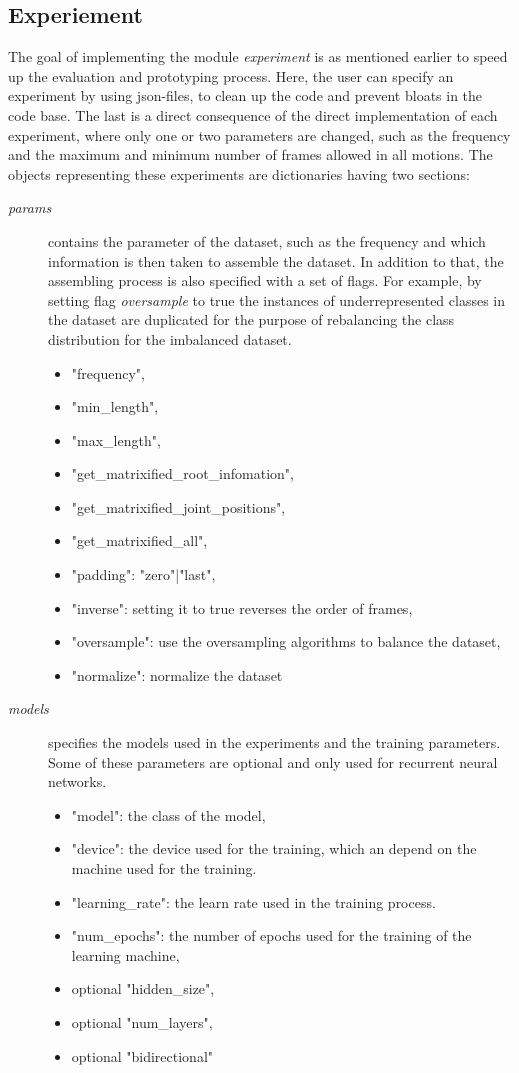 		\subsection{Experiement}
			The goal of implementing the module \textit{experiment} is as mentioned earlier to speed up the evaluation and prototyping process. Here, the user can specify an experiment by using json-files, to clean up the code and prevent bloats in the code base. The last is a direct consequence of the direct implementation of each experiment, where only one or two parameters are changed, such as the frequency and the maximum and minimum number of frames allowed in all motions. The objects representing these experiments are dictionaries having two sections:
			\begin{description}
				\item[\textit{params}] contains the parameter of the dataset, such as the frequency and which information is then taken to assemble the dataset. In addition to that, the assembling process is also specified with a set of flags. For example, by setting flag \textit{oversample} to true the instances of underrepresented classes in the dataset are duplicated for the purpose of rebalancing the class distribution for the imbalanced dataset. 
					\begin{itemize}
						\item "frequency",
						\item "min\_length",
						\item "max\_length",
						\item "get\_matrixified\_root\_infomation",
						\item "get\_matrixified\_joint\_positions",
						\item "get\_matrixified\_all",
						\item "padding": "zero"|"last",
						\item "inverse": setting it to true reverses the order of frames,
						\item "oversample": use the oversampling algorithms to balance the dataset,
						\item "normalize": normalize the dataset
					\end{itemize}
				\item[\textit{models}] specifies the models used in the experiments and the training parameters. Some of these parameters are optional and only used for recurrent neural networks.
					\begin{itemize}
						\item "model": the class of the model,
						\item "device": the device used for the training, which an depend on the machine used for the training.
						\item "learning\_rate": the learn rate used in the training process.
						\item "num\_epochs": the number of epochs used for the training of the learning machine,
						\item optional "hidden\_size",
						\item optional "num\_layers",
						\item optional "bidirectional"
					\end{itemize}
			\end{description}
